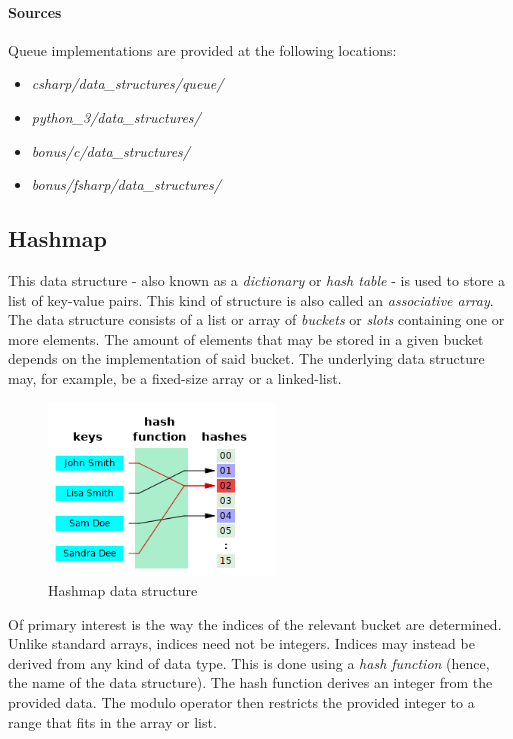 \documentclass{article}
\begin{document}
{\begin{samepage}
  \paragraph{Sources}
  Queue implementations are provided at the following locations:
  \begin{itemize}
  \item{{\em csharp/data\_structures/queue/}}
  \item{{\em python\_3/data\_structures/}}
  \item{{\em bonus/c/data\_structures/}}
  \item{{\em bonus/fsharp/data\_structures/}}
  \end{itemize}
\end{samepage}




\subsection{Hashmap}
This data structure - also known as a {\em dictionary} or {\em hash table} - is used to store a list of
key-value pairs. This kind of structure is also called an {\em associative array}. The data structure
consists of a list or array of {\em buckets} or {\em slots} containing one or more elements. The amount
of elements that may be stored in a given bucket depends on the implementation of said bucket.
The underlying data structure may, for example, be a fixed-size array or a linked-list.

\begin{figure}[H]
    \centering
    \includegraphics[width=6cm]{hash_map}
    \caption{Hashmap data structure}
\end{figure}

\begin{samepage}
  Of primary interest is the way the indices of the relevant bucket are determined. Unlike standard arrays,
  indices need not be integers. Indices may instead be derived from any kind of data type. This is done using
  a {\em hash function} (hence, the name of the data structure). The hash function derives an integer from the
  provided data. The modulo operator then restricts the provided integer to a range that fits in the array or list.
  

\end{samepage}}
\end{document}
